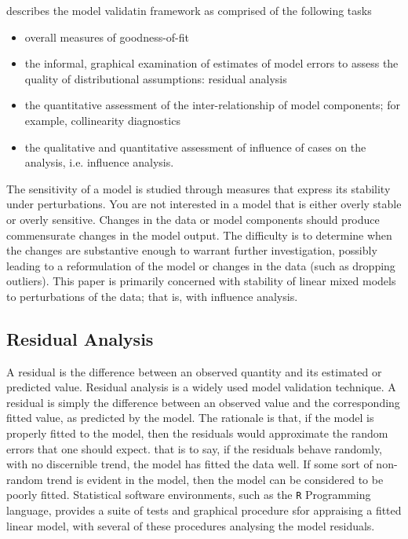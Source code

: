 \documentclass[12pt, a4paper]{article}
\begin{document}
			
			\citet{schab} describes the model validatin framework as comprised of the following tasks
			
			\begin{itemize}
				\item  overall measures of goodness-of-fit
				\item the informal, graphical examination of estimates of model errors to assess the quality of distributional
				assumptions: residual analysis
				
				
				\item the quantitative assessment of the inter-relationship of model components; for example, collinearity 	diagnostics
				\item the qualitative and quantitative assessment of influence of cases on the analysis, i.e. influence analysis.
			\end{itemize}
			
			The sensitivity of a model is studied through measures that express its stability under perturbations. You
			are not interested in a model that is either overly stable or overly sensitive. Changes in the data or model
			components should produce commensurate changes in the model output. The difficulty is to determine
			when the changes are substantive enough to warrant further investigation, possibly leading to a reformulation
			of the model or changes in the data (such as dropping outliers). This paper is primarily concerned
			with stability of linear mixed models to perturbations of the data; that is, with influence analysis. 

\subsection{Residual Analysis}
			A residual is the difference between an observed quantity and its
			estimated or predicted value. 
			Residual analysis is a widely used model validation technique. A residual is simply the difference between an observed value and the corresponding fitted value, as predicted by the model. The rationale is that, if the model is properly fitted to the model, then the residuals would approximate the random errors that one should expect.
			that is to say, if the residuals behave randomly, with no discernible trend, the model has fitted the data well. If some sort of non-random trend is evident in the model, then the model can be considered to be poorly fitted.
			Statistical software environments, such as the \texttt{R} Programming language, provides a suite of tests and graphical procedure sfor appraising a fitted linear model, with several 
			of these procedures analysing the model residuals.
			
\end{document}
